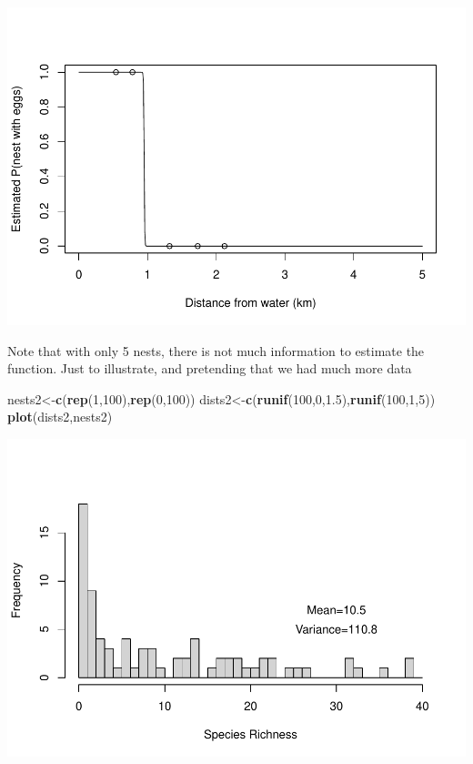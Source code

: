 \documentclass[
]{book}
\newenvironment{Shaded}{\begin{snugshade}}{\end{snugshade}}
\newcommand{\DecValTok}[1]{\textcolor[rgb]{0.00,0.00,0.81}{#1}}
\newcommand{\FloatTok}[1]{\textcolor[rgb]{0.00,0.00,0.81}{#1}}
\newcommand{\FunctionTok}[1]{\textcolor[rgb]{0.13,0.29,0.53}{\textbf{#1}}}
\newcommand{\NormalTok}[1]{#1}
\newcommand{\OtherTok}[1]{\textcolor[rgb]{0.56,0.35,0.01}{#1}}
\begin{document}
\includegraphics{ECOMODbook_files/figure-latex/ch13.36-1.pdf}

Note that with only 5 nests, there is not much information to estimate the function. Just to illustrate, and pretending that we had much more data

\begin{Shaded}
\begin{Highlighting}[]
\NormalTok{nests2}\OtherTok{\textless{}{-}}\FunctionTok{c}\NormalTok{(}\FunctionTok{rep}\NormalTok{(}\DecValTok{1}\NormalTok{,}\DecValTok{100}\NormalTok{),}\FunctionTok{rep}\NormalTok{(}\DecValTok{0}\NormalTok{,}\DecValTok{100}\NormalTok{))}
\NormalTok{dists2}\OtherTok{\textless{}{-}}\FunctionTok{c}\NormalTok{(}\FunctionTok{runif}\NormalTok{(}\DecValTok{100}\NormalTok{,}\DecValTok{0}\NormalTok{,}\FloatTok{1.5}\NormalTok{),}\FunctionTok{runif}\NormalTok{(}\DecValTok{100}\NormalTok{,}\DecValTok{1}\NormalTok{,}\DecValTok{5}\NormalTok{))}
\FunctionTok{plot}\NormalTok{(dists2,nests2)}
\end{Highlighting}
\end{Shaded}

\includegraphics{ECOMODbook_files/figure-latex/unnamed-chunk-26-1.pdf}
\end{document}
